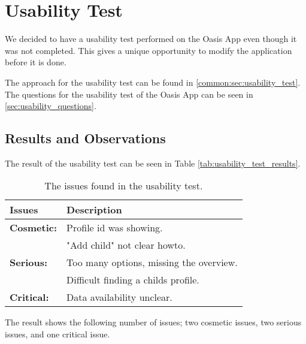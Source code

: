 \section{Usability Test}
We decided to have a usability test performed on the Oasis App even though it was not completed.
This gives a unique opportunity to modify the application before it is done.

The approach for the usability test can be found in \vref{common:sec:usability_test}.
The questions for the usability test of the Oasis App can be seen in \vref{sec:usability_questions}.

\subsection{Results and Observations}
\label{sec:usability_results}
The result of the usability test can be seen in Table \vref{tab:usability_test_results}.

\begin{table}[htbp]
	\centering
		\begin{tabular}{| p{4.5cm} | m{9cm} |}
			\hline
			\textbf{Issues} 	& \textbf{Description} \\ \hline
			
			\textbf{Cosmetic:}	& Profile id was showing. \\ 
								& "Add child" not clear howto. \\ \hline
							
			\textbf{Serious:}	& Too many options, missing the overview. \\
								& Difficult finding a childs profile. \\ \hline
						
			\textbf{Critical:} 	& Data availability unclear. \\ \hline
		\end{tabular}
	\caption{The issues found in the usability test.}
	\label{tab:usability_test_results}
\end{table}

The result shows the following number of issues; two cosmetic issues, two serious issues, and one critical issue.